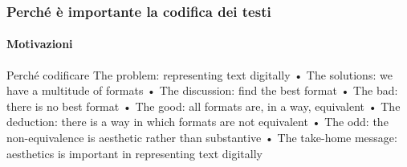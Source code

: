 \begin{frame}
    \frametitle{Perché è importante la codifica dei testi}
    \framesubtitle{Motivazioni}
    \addtocounter{nframe}{1}
    
    \begin{block}{Perché codificare}
    The problem: representing text digitally
• The solutions: we have a multitude of formats
• The discussion: find the best format
• The bad: there is no best format
• The good: all formats are, in a way, equivalent
• The deduction: there is a way in which formats
are not equivalent
• The odd: the non-equivalence is aesthetic rather
than substantive
• The take-home message: aesthetics is
important in representing text digitally 
    \end{block}

    

\end{frame}


